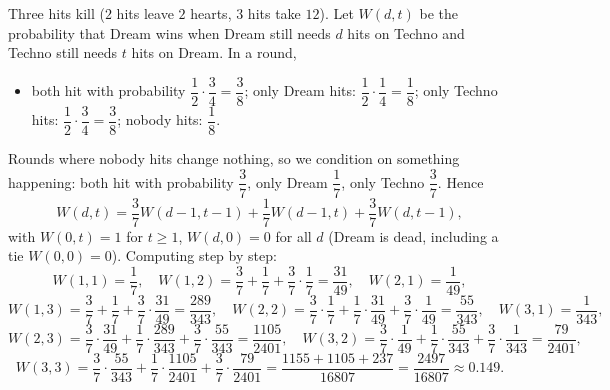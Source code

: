 Three hits kill ($2$ hits leave $2$ hearts, $3$ hits take $12$). Let $W(d,t)$ be the probability that Dream wins when Dream still needs $d$ hits on Techno and Techno still needs $t$ hits on Dream. In a round,
\begin{itemize}
\item both hit with probability $\dfrac12\cdot\dfrac34=\dfrac38$; only Dream hits: $\dfrac12\cdot\dfrac14=\dfrac18$; only Techno hits: $\dfrac12\cdot\dfrac34=\dfrac38$; nobody hits: $\dfrac18$.
\end{itemize}
Rounds where nobody hits change nothing, so we condition on something happening: both hit with probability $\dfrac37$, only Dream $\dfrac17$, only Techno $\dfrac37$. Hence
\[W(d,t)=\dfrac37W(d-1,t-1)+\dfrac17W(d-1,t)+\dfrac37W(d,t-1),\]
with $W(0,t)=1$ for $t\ge1$, $W(d,0)=0$ for all $d$ (Dream is dead, including a tie $W(0,0)=0$). Computing step by step:
\[W(1,1)=\dfrac17,\quad W(1,2)=\dfrac37+\dfrac17+\dfrac37\cdot\dfrac17=\dfrac{31}{49},\quad W(2,1)=\dfrac{1}{49},\]
\[W(1,3)=\dfrac37+\dfrac17+\dfrac37\cdot\dfrac{31}{49}=\dfrac{289}{343},\quad W(2,2)=\dfrac37\cdot\dfrac17+\dfrac17\cdot\dfrac{31}{49}+\dfrac37\cdot\dfrac1{49}=\dfrac{55}{343},\quad W(3,1)=\dfrac1{343},\]
\[W(2,3)=\dfrac37\cdot\dfrac{31}{49}+\dfrac17\cdot\dfrac{289}{343}+\dfrac37\cdot\dfrac{55}{343}=\dfrac{1105}{2401},\quad W(3,2)=\dfrac37\cdot\dfrac1{49}+\dfrac17\cdot\dfrac{55}{343}+\dfrac37\cdot\dfrac{1}{343}=\dfrac{79}{2401},\]
\[W(3,3)=\dfrac37\cdot\dfrac{55}{343}+\dfrac17\cdot\dfrac{1105}{2401}+\dfrac37\cdot\dfrac{79}{2401}=\dfrac{1155+1105+237}{16807}=\boxed{\dfrac{2497}{16807}}\approx0.149.\]
